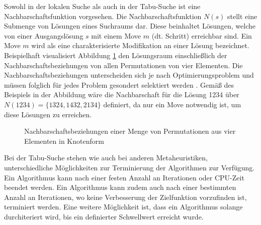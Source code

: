 Sowohl in der lokalen Suche als auch in der Tabu-Suche ist eine Nachbarschaftsfunktion vorgesehen. Die Nachbarschaftsfunktion $N(s)$ stellt eine Submenge von Lösungen eines Suchraums dar. Diese beinhaltet Lösungen, welche von einer Ausgangslösung $s$ mit einem Move $m$ (dt. Schritt) erreichbar sind. Ein Move $m$ wird als eine charakterisierte Modifikation an einer Lösung bezeichnet. \cite[vgl.][S. 56]{siarry_metaheuristics_2016} \\

Beispielhaft visualisiert Abbildung \ref{img:example_neighbourhood} den Lösungsraum einschließlich der Nachbarschaftsbeziehungen von allen Permutationen von vier Elementen. Die Nachbarschaftsbeziehungen unterscheiden sich je nach Optimierungsproblem und müssen folglich für jedes Problem gesondert selektiert werden \cite[vgl.][S. 57 f.]{siarry_metaheuristics_2016}. Gemäß des Beispiels in der Abbildung wäre die Nachbarschaft für die Lösung 1234 über $N(1234) = \{ 1324, 1432, 2134 \}$ definiert, da nur ein Move notwendig ist, um diese Lösungen zu erreichen.  

\begin{figure}[H]
    \centering
    \noindent{}
    \caption{Nachbarschaftsbeziehungen einer Menge von Permutationen aus vier Elementen in Knotenform} 
    \label{img:example_neighbourhood}
\end{figure}

Bei der Tabu-Suche stehen wie auch bei anderen Metaheuristiken, unterschiedliche Möglichkeiten zur Terminierung der Algorithmen zur Verfügung. Ein Algorithmus kann nach einer festen Anzahl an Iterationen oder CPU-Zeit beendet werden. Ein Algorithmus kann zudem auch nach einer bestimmten Anzahl an Iterationen, wo keine Verbesserung der Zielfunktion vorzufinden ist, terminiert werden. Eine weitere Möglichkeit ist, dass ein Algorithmus solange durchiteriert wird, bis ein definierter Schwellwert erreicht wurde. \cite[vgl.][S. 44]{gendreau_handbook_2019} 
